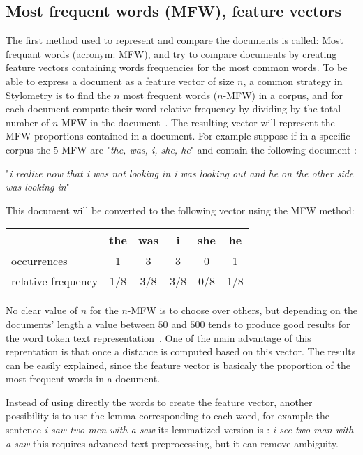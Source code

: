 \subsection{Most frequent words (MFW), feature vectors}

The first method used to represent and compare the documents is called: Most frequant words (acronym: MFW), and try to compare documents by creating feature vectors containing words frequencies for the most common words.
To be able to express a document as a feature vector of size $n$, a common strategy in Stylometry is to find the $n$ most frequent words ($n$-MFW) in a corpus, and for each document compute their word relative frequency by dividing by the total number of $n$-MFW in the document~\cite{savoy_stylo}.
The resulting vector will represent the MFW proportions contained in a document.
For example suppose if in a specific corpus the $5$-MFW are "\textit{the, was, i, she, he}" and contain the following document :

"\textit{i realize now that i was not looking in i was looking out and he on the other side was looking in}"\cite{ddlc}

This document will be converted to the following vector using the MFW method:

\begin{center}
\begin{tabular}{l c c c c c}
  \toprule
                     & the & was & i   & she & he  \\
  \midrule
  occurrences         & 1   & 3   & 3   & 0   & 1   \\
  relative frequency & 1/8 & 3/8 & 3/8 & 0/8 & 1/8 \\
  \bottomrule
\end{tabular}
\end{center}

No clear value of $n$ for the $n$-MFW is to choose over others, but depending on the documents' length a value between $50$ and $500$ tends to produce good results for the word token text representation~\cite{savoy_text_representation}.
One of the main advantage of this reprentation is that once a distance is computed based on this vector. The results can be easily explained, since the feature vector is basicaly the proportion of the most frequent words in a document.

Instead of using directly the words to create the feature vector, another possibility is to use the lemma corresponding to each word, for example the sentence \textit{i saw two men with a saw} its lemmatized version is : \textit{i see two man with a saw} this requires advanced text preprocessing, but it can remove ambiguity.

